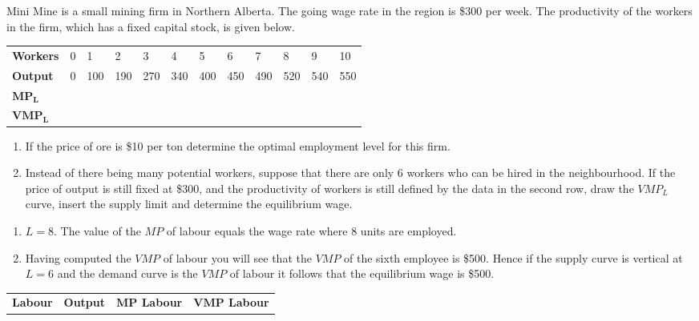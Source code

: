 \begin{enumialphparenastyle}
\begin{ex}\label{ex:ch12ex2}
Mini Mine is a small mining firm in Northern Alberta. The going wage rate in the region is \$300 per week. The productivity of the workers in the firm, which has a fixed capital stock, is given below.
\begin{center}
\begin{tabu} to \linewidth {|X[2,c]X[1,c]X[1,c]X[1,c]X[1,c]X[1,c]X[1,c]X[1,c]X[1,c]X[1,c]X[1,c]X[1,c]|}	\hline
{}	\textbf{Workers}	&	0	&	1	&	2	&	3	&	4	&	5	&	6	&	7	&	8	&	9	&	10	\\
						\textbf{Output}		&	0	&	100	&	190	&	270	&	340	&	400	&	450	&	490	&	520	&	540	&	550	\\
	\textbf{$\mathbf{MP_L}$}		&		&		&		&		&		&		&		&		&		&		&		\\
						\textbf{$\mathbf{VMP_L}$}	&		&		&		&		&		&		&		&		&		&		&		\\ \hline
\end{tabu}
\end{center}
\begin{enumerate}
	\item	If the price of ore is \$10 per ton determine the optimal employment level for this firm.						
	\item	Instead of there being many potential workers, suppose that there are only 6 workers who can be hired in the neighbourhood. If the price of output is still fixed at \$300, and the productivity of workers is still defined by the data in the second row, draw the $VMP_L$ curve, insert the supply limit and determine the equilibrium wage.
\end{enumerate}
\begin{sol}
\begin{enumerate}
	\item	$L=8$. The value of the $MP$ of labour equals the wage rate where 8 units are employed.
	\item	Having computed the $VMP$ of labour you will see that the $VMP$ of the sixth employee is \$500. Hence if the supply curve is vertical at $L=6$ and the demand curve is the $VMP$ of labour it follows that the equilibrium wage is \$500.
\end{enumerate}
\begin{center}
	\begin{tabu} to \linewidth {|X[1,c]X[1,c]X[1,c]X[1,c]|}	\hline
		\textbf{Labour}	&	\textbf{Output}	&	\textbf{$\mathbf{MP}$ Labour}	&	\textbf{$\mathbf{VMP}$ Labour}	\\

\end{tabu}
\end{center}
\end{sol}
\end{ex}
\end{enumialphparenastyle}
